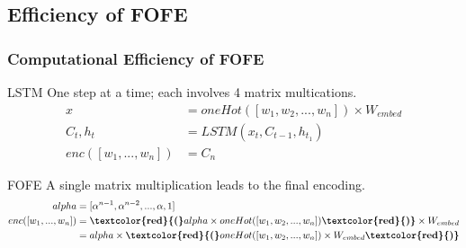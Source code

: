 \documentclass{beamer}
\begin{document}
\subsection{Efficiency of FOFE}
\begin{frame}
\frametitle{Computational Efficiency of FOFE}
	\begin{block}{LSTM}
		One step at a time; each involves 4 matrix multications.
		\begin{align*}
		x & = oneHot([w_1, w_2, ..., w_n]) \times W_{embed}\\
		C_t, h_t & = LSTM(x_t, C_{t-1}, h_{t_1})\\
		enc([w_1, ..., w_n]) & = C_n
		\end{align*}
	\end{block}
	\begin{block}{FOFE}
		A single matrix multiplication leads to the final encoding.
		\begin{align*}
			alpha & = [\alpha^{n-1}, \alpha^{n-2}, ... , \alpha, 1] \\
			enc([w_1, ..., w_n])
			& =
				\textbf{\textcolor{red}{(}} alpha
				\times oneHot([w_1, w_2, ..., w_n])
				\textbf{\textcolor{red}{)}} \times W_{embed} \\
			& =
				alpha \times \textbf{\textcolor{red}{(}}
				oneHot([w_1, w_2, ..., w_n]) \times W_{embed}
				\textbf{\textcolor{red}{)}}
		\end{align*}
	\end{block}
\end{frame}


\end{document}
